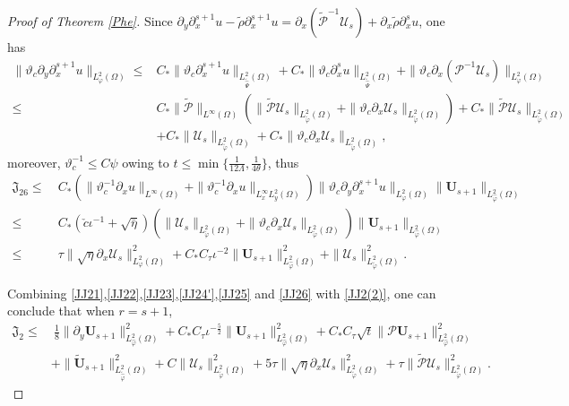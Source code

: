 \documentclass[10pt,a4paper]{amsart}
\begin{document}
\begin{proof}[Proof of Theorem \ref{Phe}]
Since $\partial_{y}\partial_{x}^{s+1}u-\tilde{\rho}\partial_{x}^{s+1}u=\partial_{x}(\tilde{\mathcal{P}}^{-1}\mathcal{U}_{s})+\partial_{x}\tilde{\rho}\partial_{x}^{s}u$, one has
\begin{align*}
\|\vartheta_{c}\partial_{y}\partial_{x}^{s+1}u\|_{L_{\varphi}^{2}(\Omega)}
\leq& C_{*}\|\vartheta_{c}\partial_{x}^{s+1}u\|_{L_{\tilde{\hat{\Psi}}}^{2}(\Omega)}
    +C_{*}\|\vartheta_{c}\partial_{x}^{s}u\|_{L_{\tilde{\hat{\Psi}}}^{2}(\Omega)}
    +\|\vartheta_{c}\partial_{x}(\mathcal{P}^{-1}\mathcal{U}_{s})\|_{L_{\varphi}^{2}(\Omega)}\\
\leq& C_{*}\|\tilde{\mathcal{P}}\|_{L^{\infty}(\Omega)}
           \left(\|\tilde{\mathcal{P}}\mathcal{U}_{s}\|_{L_{\tilde{\varphi}}^{2}(\Omega)}+\|\vartheta_{c}\partial_{x}\mathcal{U}_{s}\|_{L_{\tilde{\varphi}}^{2}(\Omega)}\right)
     +C_{*}\|\tilde{\mathcal{P}}\mathcal{U}_{s}\|_{L_{\tilde{\varphi}}^{2}(\Omega)}\\
    &+C_{*}\|\mathcal{U}_{s}\|_{L_{\tilde{\varphi}}^{2}(\Omega)}
     +C_{*}\|\vartheta_{c}\partial_{x}\mathcal{U}_{s}\|_{L_{\tilde{\varphi}}^{2}(\Omega)},
\end{align*}
moreover, $\vartheta_{c}^{-1}\leq C\psi$ owing to $t\leq \min\{\frac{1}{12\Lambda},\frac{1}{4\theta}\}$, thus
\begin{align}\label{JJ26}
\mathfrak{J}_{26}
\leq&~C_{*}\left(\|\vartheta_{c}^{-1}\partial_{x}u\|_{L^{\infty}(\Omega)}
                 +\|\vartheta_{c}^{-1}\partial_{x}u\|_{L_{x}^{\infty}L_{y}^{2}(\Omega)}\right)
          \|\vartheta_{c}\partial_{y}\partial_{x}^{s+1}u\|_{L_{\varphi}^{2}(\Omega)}\|\mathbf{U}_{s+1}\|_{L_{\hat{\varphi}}^{2}(\Omega)}\\
\leq&~C_{*}(\check{c}\iota^{-1}+\sqrt{\bar{\eta}})
           \left(\|\mathcal{U}_{s}\|_{L_{\tilde{\varphi}}^{2}(\Omega)}+\|\vartheta_{c}\partial_{x}\mathcal{U}_{s}\|_{L_{\tilde{\varphi}}^{2}(\Omega)}\right)
           \|\mathbf{U}_{s+1}\|_{L_{\hat{\varphi}}^{2}(\Omega)}\nonumber\\
\leq&~\tau\|\sqrt{\eta}\partial_{x}\mathcal{U}_{s}\|_{L_{\varphi}^{2}(\Omega)}^{2}
     +C_{*}C_{\tau}\iota^{-2}\|\mathbf{U}_{s+1}\|_{L_{\hat{\varphi}}^{2}(\Omega)}^{2}
     +\|\mathcal{U}_{s}\|_{L_{\tilde{\varphi}}^{2}(\Omega)}^{2}.\nonumber
\end{align}

Combining \eqref{JJ21},\eqref{JJ22},\eqref{JJ23},\eqref{JJ24'},\eqref{JJ25} and \eqref{JJ26} with \eqref{JJ2(2)}, one can conclude that when $r=s+1$,
\begin{align*}
\mathfrak{J}_{2}
\leq&~\frac{1}{8}\|\partial_{y}\mathbf{U}_{s+1}\|_{L_{\hat{\varphi}}^{2}(\Omega)}^{2}
     +C_{*}C_{\tau}\iota^{-\frac{5}{2}}\|\mathbf{U}_{s+1}\|_{L_{\hat{\varphi}}^{2}(\Omega)}^{2}
     +C_{*}C_{\tau}\sqrt{t}\|\mathcal{P}\mathbf{U}_{s+1}\|_{L_{\hat{\varphi}}^{2}(\Omega)}^{2}\\
    &+\|\tilde{\mathbf{U}}_{s+1}\|_{L_{\tilde{\hat{\varphi}}}^{2}(\Omega)}^{2}
     +C\|\mathcal{U}_{s}\|_{L_{\tilde{\varphi}}^{2}(\Omega)}^{2}
     +5\tau\|\sqrt{\eta}\partial_{x}\mathcal{U}_{s}\|_{L_{\tilde{\varphi}}^{2}(\Omega)}^{2}
     +\tau\|\tilde{\mathcal{P}}\mathcal{U}_{s}\|_{L_{\tilde{\varphi}}^{2}(\Omega)}^{2}.
\end{align*}


\end{proof}
\end{document}
